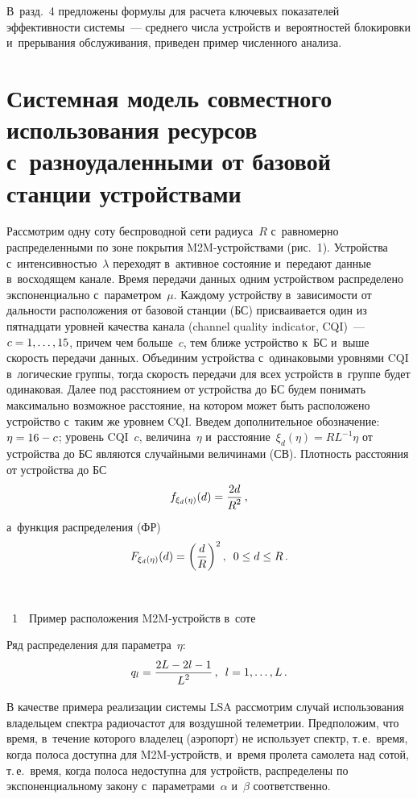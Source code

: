 \begin{multicols}{2}
В~разд.~4 предложены формулы для расчета ключевых показателей 
эффективности системы~--- среднего числа устройств и~вероятностей 
блокировки и~прерывания обслуживания, приведен пример численного анализа.

\section{Системная модель совместного использования ресурсов 
с~разноудаленными от базовой станции устройствами}

Рассмотрим одну соту беспроводной сети радиуса~$R$ с~равномерно 
распределенными по зоне покрытия M2M-устройствами (рис.~1). Устройства 
с~интенсивностью~$\lambda$ переходят в~активное состояние и~передают 
данные в~восходящем канале. Время передачи данных одним устройством 
распределено экспоненциально с~параметром~$\mu$. Каждому устройству 
в~зависимости от дальности расположения от базовой станции (БС) 
присваивается один из пятнадцати уровней качества канала (channel quality 
indicator, CQI)~--- $c\hm=1,\ldots ,15$, причем чем больше~$c$, тем ближе 
устройство к~БС и~выше скорость передачи данных. Объединим устройства 
с~одинаковыми уровнями CQI в~логические группы, тогда скорость передачи 
для всех устройств в~группе будет одинаковая. Далее под расстоянием от 
устройства до БС будем понимать максимально возможное расстояние, на 
котором может быть расположено устройство с~таким же уровнем CQI. Введем 
дополнительное обозначение: $\eta\hm=16-c$; уровень CQI~$c$, 
величина~$\eta$ и~расстояние~$\xi_d(\eta)=RL^{-1}\eta$ от устройства до БС 
являются случайными величинами (СВ). Плотность расстояния от устройства 
до БС $$
f_{\xi_d(\eta)}(d)=\displaystyle\frac{\displaystyle 2d\mathstrut}{\displaystyle R^2\mathstrut}\,,
$$
 а~функция распределения (ФР)
$$
F_{\xi_d(\eta)}(d)=\left(\displaystyle\frac{\displaystyle d\mathstrut}{\displaystyle R\mathstrut}\right)^2,\enskip 0\leq d\leq R\,.
$$


 { \begin{center}  %
 \vspace*{5pt}
 \mbox{%
\epsfxsize=72mm %
}


\vspace*{4pt}


\noindent
{{\figurename~1}\ \ \small{Пример расположения M2M-устройств в~соте}}
\end{center}
}


\addtocounter{figure}{1}

 \noindent
 Ряд распределения для 
параметра~$\eta$:  
$$
q_l=\displaystyle\frac{\displaystyle 2L-2l-1\mathstrut}{\displaystyle L^2\mathstrut}\,,\enskip l=1,\ldots ,L\,.
$$

  
  В качестве примера реализации системы LSA рассмотрим случай 
использования владельцем спектра радиочастот для воздушной телеметрии. 
Предположим, что время, в~течение которого владелец (аэропорт) не 
использует спектр, т.\,е.\ время, когда полоса доступна для M2M-устройств, 
и~время пролета самолета над сотой, т.\,е.\ время, когда полоса недоступна для 
устройств, распределены по экспоненциальному закону с~параметрами~$\alpha$ 
и~$\beta$ соответственно.
  

\end{multicols}
